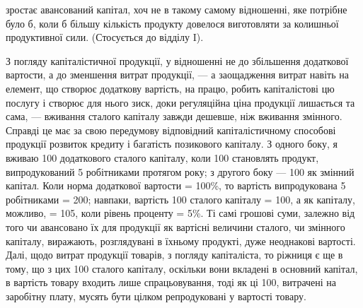 \parcont{}  %
зростає авансований капітал, хоч не в такому самому відношенні, яке потрібне
було б, коли б більшу кількість продукту довелося виготовляти за колишньої
продуктивної сили. (Стосується до відділу I).

З погляду капіталістичної продукції, у відношенні не до збільшення додаткової
вартости, а до зменшення витрат продукції, — а заощадження витрат
навіть на елемент, що створює додаткову вартість, на працю, робить капіталістові
цю послугу і створює для нього зиск, доки регуляційна ціна продукції
лишається та сама, — вживання сталого капіталу завжди дешевше, ніж
вживання змінного. Справді це має за свою передумову відповідний капіталістичному
способові продукції розвиток кредиту і багатість позикового капіталу. З одного
боку, я вживаю 100 додаткового сталого капіталу, коли 100 становлять продукт, випродукований 5 робітниками протягом року; з
другого боку — 100 як змінний капітал. Коли норма додаткової вартости
= 100\%, то вартість випродукована 5 робітниками = 200;
навпаки, вартість 100 сталого капіталу = 100, а як капіталу,
можливо, = 105, коли рівень проценту = 5\%. Ті самі грошові суми,
залежно від того чи авансовано їх для продукції як вартісні величини сталого,
чи змінного капіталу, виражають, розглядувані в їхньому продукті, дуже неоднакові
вартості. Далі, щодо витрат продукції товарів, з погляду капіталіста,
то ріжниця є ще в тому, що з цих 100 сталого капіталу, оскільки
вони вкладені в основний капітал, в вартість товару входить лише спрацьовування,
тоді як ці 100, витрачені на заробітну плату, мусять бути
цілком репродуковані у вартості товару.

